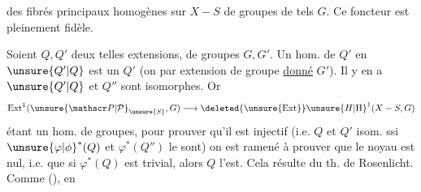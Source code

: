  des fibrés principaux homogènes sur $X-S$ de groupes de tels $G$. Ce foncteur est pleinement fidèle.

Soient $Q,Q'$ deux telles extensions, de groupes $G,G'$. Un hom. de $Q'$ en $\unsure{Q'|Q}$ est  un     $Q'$  (on  par extension de groupe \uline{donné} $G'$). Il y en a  $\unsure{Q'|Q}$ et $Q''$ sont isomorphes. Or
\[
\operatorname{Ext}^1(\unsure{\mathscr P|\mathcal P}_{\unsure{S}},G)\longrightarrow\deleted{\unsure{\operatorname{Ext}}}\unsure{H|\mathrm H}^1(X-S,G)
\]
étant un hom. de groupes, pour prouver qu’il est injectif (i.e. $Q$ et $Q'$ isom. ssi $\unsure{\varphi|\phi}^*(Q)$ et $\varphi^*(Q'')$ le sont) on est ramené à prouver que le noyau est nul, i.e. que si $\varphi^*(Q)$ est trivial, alors $Q$ l’est. Cela résulte   du th. de Rosenlicht.
Comme  (),  en
